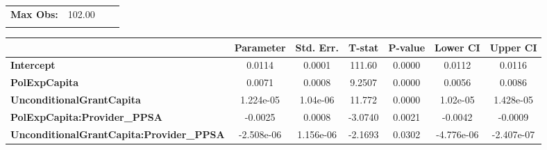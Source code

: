 \begin{center}
\begin{tabular}{lclc}
\textbf{Max Obs:}                                &       102.00       & \textbf{                     }   &                  \\
\textbf{}                                        &                    & \textbf{                     }   &                  \\
\bottomrule
\end{tabular}
\begin{tabular}{lcccccc}
                                                 & \textbf{Parameter} & \textbf{Std. Err.} & \textbf{T-stat} & \textbf{P-value} & \textbf{Lower CI} & \textbf{Upper CI}  \\
\midrule
\textbf{Intercept}                               &       0.0114       &       0.0001       &      111.60     &      0.0000      &       0.0112      &       0.0116       \\
\textbf{PolExpCapita}                            &       0.0071       &       0.0008       &      9.2507     &      0.0000      &       0.0056      &       0.0086       \\
\textbf{UnconditionalGrantCapita}                &     1.224e-05      &      1.04e-06      &      11.772     &      0.0000      &      1.02e-05     &     1.428e-05      \\
\textbf{PolExpCapita:Provider\_PPSA}             &      -0.0025       &       0.0008       &     -3.0740     &      0.0021      &      -0.0042      &      -0.0009       \\
\textbf{UnconditionalGrantCapita:Provider\_PPSA} &     -2.508e-06     &     1.156e-06      &     -2.1693     &      0.0302      &     -4.776e-06    &     -2.407e-07     \\
\bottomrule
\end{tabular}
\end{center}